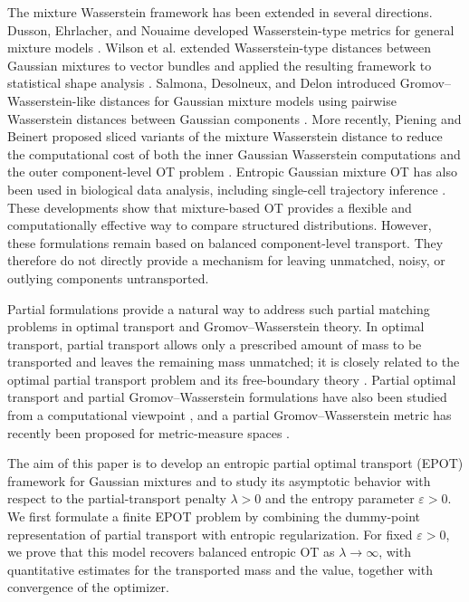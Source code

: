\documentclass[a4paper,11pt]{article}
\numberwithin{equation}{section}
\newcommand{\eps}{\varepsilon}
\begin{document}
The mixture Wasserstein framework has been extended in several directions. Dusson, Ehrlacher, and Nouaime developed Wasserstein-type metrics for general mixture models \cite{dusson2023wasserstein}. Wilson et al. extended Wasserstein-type distances between Gaussian mixtures to vector bundles and applied the resulting framework to statistical shape analysis \cite{wilson2024wasserstein}. Salmona, Desolneux, and Delon introduced Gromov--Wasserstein-like distances for Gaussian mixture models using pairwise Wasserstein distances between Gaussian components \cite{delon-2023}. More recently, Piening and Beinert proposed sliced variants of the mixture Wasserstein distance to reduce the computational cost of both the inner Gaussian Wasserstein computations and the outer component-level OT problem \cite{piening2025slicing}. Entropic Gaussian mixture OT has also been used in biological data analysis, including single-cell trajectory inference \cite{PMID:39710672}. These developments show that mixture-based OT provides a flexible and computationally effective way to compare structured distributions. However, these formulations remain based on balanced component-level transport. They therefore do not directly provide a mechanism for leaving unmatched, noisy, or outlying components untransported.

Partial formulations provide a natural way to address such partial matching problems in optimal transport and Gromov--Wasserstein theory. In optimal transport, partial transport allows only a prescribed amount of mass to be transported and leaves the remaining mass unmatched; it is closely related to the optimal partial transport problem and its free-boundary theory \cite{caffarelli2010free,figalli2010optimal}. Partial optimal transport and partial Gromov--Wasserstein formulations have also been studied from a computational viewpoint \cite{chapel2020partial}, and a partial Gromov--Wasserstein metric has recently been proposed for metric-measure spaces \cite{Bai2025}. 

The aim of this paper is to develop an entropic partial optimal transport (EPOT) framework for Gaussian mixtures and to study its asymptotic behavior with respect to the partial-transport penalty $\lambda > 0$ and the entropy parameter $\eps > 0$. We first formulate a finite EPOT problem by combining the dummy-point representation of partial transport with entropic regularization. For fixed $\eps > 0$, we prove that this model recovers balanced entropic OT as $\lambda \to \infty$, with quantitative estimates for the transported mass and the value, together with convergence of the optimizer.
\end{document}
